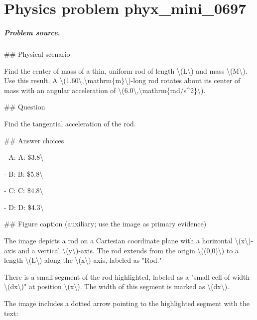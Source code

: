 
\chapter{Physics problem phyx\_mini\_0697}
\label{ch:PhyXMiniProblems_problem_phyx_mini_0697}

\paragraph{Problem source.}
\#\# Physical scenario

Find the center of mass of a thin, uniform rod of length \textbackslash{}(L\textbackslash{}) and mass \textbackslash{}(M\textbackslash{}). Use this result. A \textbackslash{}(1.60\textbackslash{},\textbackslash{}mathrm\{m\}\textbackslash{})-long rod rotates about its center of mass with an angular acceleration of \textbackslash{}(6.0\textbackslash{},\textbackslash{}mathrm\{rad/s\textasciicircum{}2\}\textbackslash{}).

\#\# Question

Find the tangential acceleration of the rod.

\#\# Answer choices

- A: A: \$3.8\textbackslash{}

- B: B: \$5.8\textbackslash{}

- C: C: \$4.8\textbackslash{}

- D: D: \$4.3\textbackslash{}

\#\# Figure caption (auxiliary; use the image as primary evidence)

The image depicts a rod on a Cartesian coordinate plane with a horizontal \textbackslash{}(x\textbackslash{})-axis and a vertical \textbackslash{}(y\textbackslash{})-axis. The rod extends from the origin \textbackslash{}((0,0)\textbackslash{}) to a length \textbackslash{}(L\textbackslash{}) along the \textbackslash{}(x\textbackslash{})-axis, labeled as "Rod."

There is a small segment of the rod highlighted, labeled as a "small cell of width \textbackslash{}(dx\textbackslash{})" at position \textbackslash{}(x\textbackslash{}). The width of this segment is marked as \textbackslash{}(dx\textbackslash{}).

The image includes a dotted arrow pointing to the highlighted segment with the text: 

